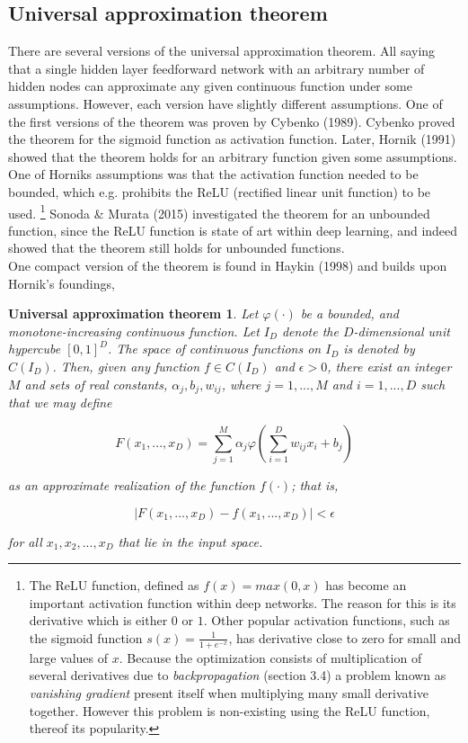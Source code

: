 \documentclass[12pt, letterpaper]{amsart}%
\begin{document}
\subsection{Universal approximation theorem}
There are several versions of the universal approximation theorem. All saying that a single hidden layer feedforward network with an arbitrary number of hidden nodes can approximate any given continuous function under some assumptions. However, each version have slightly different assumptions. One of the first versions of the theorem was proven by Cybenko (1989). Cybenko proved the theorem for the sigmoid function as activation function. Later, Hornik (1991) showed that the theorem holds for an arbitrary function given some assumptions. One of Horniks assumptions was that the activation function needed to be bounded, which e.g. prohibits the ReLU (rectified linear unit function) to be used. \footnote{The ReLU function, defined as $f(x) = max(0,x)$ has become an important activation function within deep networks. The reason for this is its derivative which is either $0$ or $1$. Other popular activation functions, such as the sigmoid function $s(x) = \frac{1}{1 + e^{-x}}$, has derivative close to zero for small and large values of $x$. Because the optimization consists of multiplication of several derivatives due to \textit{backpropagation} (section 3.4) a problem known as \textit{vanishing gradient} present itself when multiplying many small derivative together. However this problem is non-existing using the ReLU function, thereof its popularity.} Sonoda \& Murata (2015) investigated the theorem for an unbounded function, since the ReLU function is state of art within deep learning, and indeed showed that the theorem still holds for unbounded functions.
\\

One compact version of the theorem is found in Haykin (1998) and builds upon Hornik's foundings,

\newtheorem*{mydef}{Universal approximation theorem}

\begin{mydef}
Let $\varphi (\cdot)$ be a bounded, and monotone-increasing continuous function. Let $I_{D}$ denote the $D$-dimensional unit hypercube $[0,1]^{D}$. The space of continuous functions on $I_{D}$ is denoted by $C(I_{D})$. Then, given any function $f \in C(I_{D})$ and $\epsilon > 0$, there exist an integer $M$ and sets of real constants, $\alpha_j, b_j, w_{ij}$, where $j = 1, ...,M$ and $i = 1, ...,D$ such that we may define

\begin{equation}
    F(x_1, ..., x_{D}) = \sum_{j=1}^{M} \alpha_j \varphi \left( \sum_{i=1}^{D} w_{ij} x_i + b_j \right)
\end{equation}

as an approximate realization of the function $f(\cdot)$; that is,

\begin{equation}
    \vert F(x_1, ..., x_{D}) - f(x_1, ..., x_{D}) \vert < \epsilon
\end{equation}

for all $x_1, x_2, ..., x_{D}$ that lie in the input space.

\end{mydef}
\end{document}
